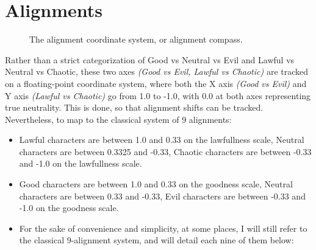 \documentclass[tikz,openany,11pt,a4paper]{book}
\begin{document}
\section{Alignments}
\begin{figure}[h]
\captionsetup{justification=centering}
\begin{center}
  \caption{The alignment coordinate system, or alignment compass.}
  \end{center}
\end{figure}
Rather than a strict categorization of Good vs Neutral vs Evil and Lawful vs Neutral vs Chaotic, these two axes \textit{(Good vs Evil, Lawful vs Chaotic)} are tracked on a floating-point coordinate system, where both the X axis \textit{(Good vs Evil)} and Y axis \textit{(Lawful vs Chaotic)} go from 1.0 to -1.0, with 0.0 at both axes representing true neutrality. This is done, so that alignment shifts can be tracked. Nevertheless, to map to the classical system of 9 alignments:
\begin{itemize}
\item Lawful characters are between 1.0 and 0.33 on the lawfullness scale, Neutral characters are between 0.3325 and -0.33, Chaotic characters are between -0.33 and -1.0 on the lawfullness scale.
\item Good characters are between 1.0 and 0.33 on the goodness scale, Neutral characters are between 0.33 and -0.33, Evil characters are between -0.33 and -1.0 on the goodness scale.
\item For the sake of convenience and simplicity, at some places, I will still refer to the classical 9-alignment system, and will detail each nine of them below:
\end{itemize}
\end{document}
